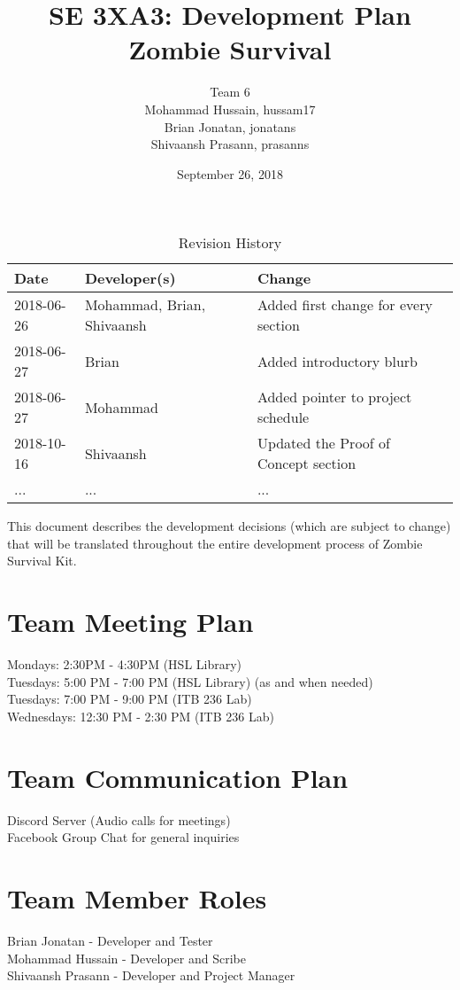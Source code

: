 \documentclass{article}
\title{SE 3XA3: Development Plan\\Zombie Survival}
\author{Team 6
		\\ Mohammad Hussain, hussam17
		\\ Brian Jonatan,  jonatans
		\\ Shivaansh Prasann, prasanns
}
\date{September 26, 2018}
\begin{document}
\begin{table}[hp]
\caption{Revision History} \label{TblRevisionHistory}
\begin{tabularx}{\textwidth}{llX}
\toprule
\textbf{Date} & \textbf{Developer(s)} & \textbf{Change}\\
\midrule
2018-06-26 & Mohammad, Brian, Shivaansh & Added first change for every section\\
2018-06-27 & Brian & Added introductory blurb\\
2018-06-27 & Mohammad & Added pointer to project schedule\\
2018-10-16 & Shivaansh & Updated the Proof of Concept section\\
... & ... & ...\\
\bottomrule
\end{tabularx}
\end{table}

\newpage

\maketitle

This document describes the development decisions (which are subject to change) that will be translated throughout the entire development process of Zombie Survival Kit.

\section{Team Meeting Plan}
Mondays: 2:30PM - 4:30PM (HSL Library)\\
Tuesdays: 5:00 PM - 7:00 PM (HSL Library) (as and when needed)\\
Tuesdays: 7:00 PM - 9:00 PM (ITB 236 Lab)\\
Wednesdays: 12:30 PM - 2:30 PM (ITB 236 Lab)

\section{Team Communication Plan}
Discord Server (Audio calls for meetings)\\
Facebook Group Chat for general inquiries

\section{Team Member Roles}
Brian Jonatan - Developer and Tester\\
Mohammad Hussain - Developer and Scribe\\
Shivaansh Prasann - Developer and Project Manager
\end{document}
